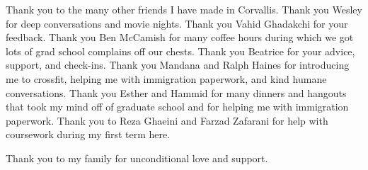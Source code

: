 Thank you to the many other friends I have made in Corvallis. 
%
Thank you Wesley  for deep conversations and movie nights.
%
Thank you Vahid Ghadakchi for your feedback.
%
Thank you Ben McCamish for many coffee hours during which we got lots of grad school complains off our chests.
%
Thank you Beatrice  for your advice, support, and check-ins. 
%
Thank you Mandana and Ralph Haines for introducing me to crossfit, helping me with immigration
paperwork, and kind humane conversations. 
%
Thank you Esther and Hammid  for many dinners and hangouts that took my mind off of
graduate school and for helping me with immigration paperwork.
%
Thank you to Reza Ghaeini and Farzad Zafarani for help with coursework during my first term here. 
%

Thank you to my family for unconditional love and support. 
